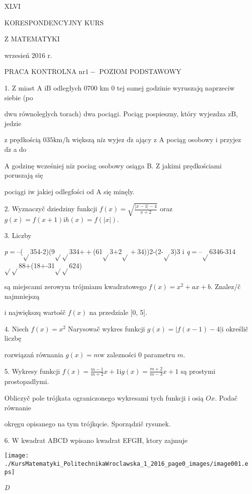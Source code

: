\documentclass[a4paper,12pt]{article}
\begin{document}
XLVI

KORESPONDENCYJNY KURS

Z MATEMATYKI

wrzesień 2016 r.

PRACA KONTROLNA $\mathrm{n}\mathrm{r} 1-$ POZIOM PODSTAWOWY

1. $\mathrm{Z}$ miast A $\mathrm{i}\mathrm{B}$ odległych $0700$ km $0$ tej samej godzinie wyruszajq naprzeciw siebie (po

dwu równoleglych torach) dwa pociągi. Pociąg pospieszny, który wyjezdza $\mathrm{z}\mathrm{B}$, jedzie

$\mathrm{z}$ prędkością $035\mathrm{k}\mathrm{m}/\mathrm{h}$ większą $\mathrm{n}\mathrm{i}\dot{\mathrm{z}}$ wyjez $\mathrm{d}\dot{\mathrm{z}}$ ający $\mathrm{z}$ A pociąg osobowy $\mathrm{i}$ przyjez $\mathrm{d}\dot{\mathrm{z}}$ a do

A godzinę wcześniej $\mathrm{n}\mathrm{i}\dot{\mathrm{z}}$ pociag osobowy osiąga B. $\mathrm{Z}$ jakimi prędkościami poruszają się

pociągi $\mathrm{i}\mathrm{w}$ jakiej odlegfości od A się minęly.

2. Wyznaczyč dziedziny funkcji $f(x)=\sqrt{\frac{|x-1|-4}{x+2}}$ oraz $g(x)=f(x+1) \mathrm{i}h(x)=f(|x|).$

3. Liczby

{\it p}$=$--($\sqrt{}$354-2)(9$\sqrt{}\sqrt{}$334$++$(61$\sqrt{}$3$+$2$\sqrt{}+$34))2-(2-$\sqrt{}$3)3 i {\it q}$=$--$\sqrt{}$6346-314$\sqrt{}\sqrt{}$88$+$(18$+$-31$\sqrt{}\sqrt{}$624)

są miejscami zerowym trójmianu kwadratowego $f(x)=x^{2}+ax+b$. Znalez/č najmniejszą

$\mathrm{i}$ największq wartośč $f(x)$ na przedziale $[0$, 5$].$

4. Niech $f(x) = x^{2}$ Narysowač wykres funkcji $g(x) = |f(x-1) -4| \mathrm{i}$ określič liczbę

rozwiązań równania $g(x)=m\mathrm{w}$ zalezności $0$ parametru $m.$

5. Wykresy funkcji $f(x) = \displaystyle \frac{m-1}{m+2}x+1\mathrm{i}g(x) =\displaystyle \frac{m+2}{m-3}x+1$ są prostymi prostopadlymi.

Obliczyč pole trójkata ograniczonego wykresami tych funkcji $\mathrm{i}$ osią $Ox$. Podač równanie

okręgu opisanego na tym trójkqcie. Sporządzič rysunek.

6. $\mathrm{W}$ kwadrat ABCD wpisano kwadrat EFGH, ktory zajmuje
\begin{center}
\texttt{[image: ./KursMatematyki\_PolitechnikaWroclawska\_1\_2016\_page0\_images/image001.eps]}
\end{center}
{\it D}
\end{document}
